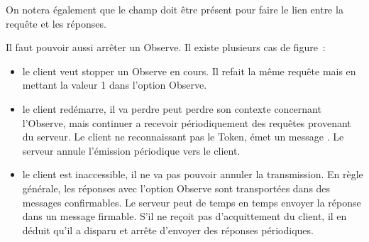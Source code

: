          \vspace{1em}

On notera également que le champ  doit être présent pour faire le lien entre la requête et les réponses.

         \vspace{1em}

Il faut pouvoir aussi arrêter un Observe. Il existe plusieurs cas de figure~:
\begin{itemize}
    \item le client veut stopper un Observe en cours. Il refait la même requête mais en mettant la valeur 1 dans l'option Observe.
    \item le client redémarre, il va perdre peut perdre son contexte concernant l'Observe, mais continuer a recevoir périodiquement des requêtes provenant du serveur. Le client ne reconnaissant pas le Token, émet un message . Le serveur annule l'émission périodique vers le client.
    \item le client est inaccessible, il ne va pas pouvoir annuler la transmission. En règle générale, les réponses avec l'option Observe sont transportées dans des messages  confirmables. Le serveur peut de temps en temps envoyer la réponse dans un message firmable. S'il ne reçoit pas d'acquittement du client, il en déduit qu'il a disparu et arrête d'envoyer des réponses périodiques.
\end{itemize}


